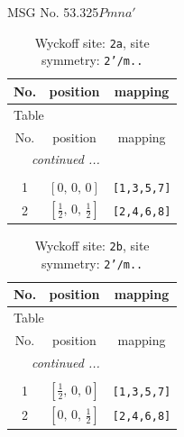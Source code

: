\documentclass[fleqn,8pt]{jsarticle}
\begin{document}
\setcounter{MaxMatrixCols}{32}

\renewcommand{\tablename}{Table~}
\renewcommand{\figurename}{Figure~}
\begin{center}
\LARGE
MSG No. 53.325\quad$Pmna'$
\end{center}
\renewcommand{\arraystretch}{1.2}
\begin{longtable}{ccc}
\caption{Wyckoff site: {\tt 2a}, site symmetry: {\tt 2'/m..}}
 \\
 \hline \hline
No. & position & mapping \\ \hline \endfirsthead

\multicolumn{2}{l}{\tablename\ \thetable{}} \\
 \hline \hline
No. & position & mapping \\ \hline \endhead

 \hline \hline
\multicolumn{2}{r}{\footnotesize\it continued ...} \\ \endfoot

 \hline \hline
\multicolumn{2}{r}{} \\ \endlastfoot

1 & $\left[ 0,\, 0,\, 0 \right]$ & {\tt [1,3,5,7]} \\ \hline
2 & $\left[ \frac{1}{2},\, 0,\, \frac{1}{2} \right]$ & {\tt [2,4,6,8]} \\
\end{longtable}
\renewcommand{\arraystretch}{1.2}
\begin{longtable}{ccc}
\caption{Wyckoff site: {\tt 2b}, site symmetry: {\tt 2'/m..}}
 \\
 \hline \hline
No. & position & mapping \\ \hline \endfirsthead

\multicolumn{2}{l}{\tablename\ \thetable{}} \\
 \hline \hline
No. & position & mapping \\ \hline \endhead

 \hline \hline
\multicolumn{2}{r}{\footnotesize\it continued ...} \\ \endfoot

 \hline \hline
\multicolumn{2}{r}{} \\ \endlastfoot

1 & $\left[ \frac{1}{2},\, 0,\, 0 \right]$ & {\tt [1,3,5,7]} \\ \hline
2 & $\left[ 0,\, 0,\, \frac{1}{2} \right]$ & {\tt [2,4,6,8]} \\
\end{longtable}
\renewcommand{\arraystretch}{1.2}
\end{document}
